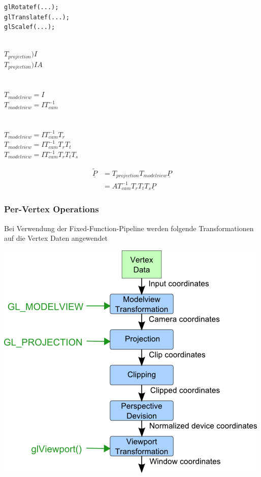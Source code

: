 \documentclass{scrartcl}
\begin{document}
\begin{itemize}
\begin{minipage}{.5\textwidth}
\begin{lstlisting}
glRotatef(...);
glTranslatef(...);
glScalef(...);
	\end{lstlisting}
	\end{minipage}
	\begin{minipage}{.5\textwidth}
		\ \\
		$T_{projection} ) I$ \\
		$T_{projection} ) I A$ \\
		\\
		\\
		$T_{modelview} = I$ \\
		$T_{modelview} = IT_{cam}^{-1}$ \\
		\\
		\\
		$T_{modelview} = IT_{cam}^{-1}T_r$ \\
		$T_{modelview} = IT_{cam}^{-1}T_r T_t$ \\
		$T_{modelview} = IT_{cam}^{-1}T_r T_t T_s$ \\
	\end{minipage}
	\begin{equation}
		\begin{split}
			\underline{\widetilde{P}} &= T_{projection} T_{modelview} \underline{P} \\
			&= AT_{cam}^{-1} T_r T_t T_s \underline{P}
		\end{split}
	\end{equation}
\end{itemize}

\subsubsection{Per-Vertex Operations}

Bei Verwendung der Fixed-Function-Pipeline werden folgende Transformationen auf die Vertex Daten angewendet

\includegraphics[scale=1]{figures/pervertex_fixedfunction_pipeline.png}
\end{document}
